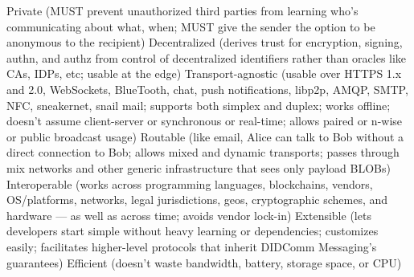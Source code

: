 Private (MUST prevent unauthorized third parties from learning who’s communicating about what, when; MUST give the sender the option to be anonymous to the recipient)
Decentralized (derives trust for encryption, signing, authn, and authz from control of decentralized identifiers rather than oracles like CAs, IDPs, etc; usable at the edge)
Transport-agnostic (usable over HTTPS 1.x and 2.0, WebSockets, BlueTooth, chat, push notifications, libp2p, AMQP, SMTP, NFC, sneakernet, snail mail; supports both simplex and duplex; works offline; doesn’t assume client-server or synchronous or real-time; allows paired or n-wise or public broadcast usage)
Routable (like email, Alice can talk to Bob without a direct connection to Bob; allows mixed and dynamic transports; passes through mix networks and other generic infrastructure that sees only payload BLOBs)
Interoperable (works across programming languages, blockchains, vendors, OS/platforms, networks, legal jurisdictions, geos, cryptographic schemes, and hardware — as well as across time; avoids vendor lock-in)
Extensible (lets developers start simple without heavy learning or dependencies; customizes easily; facilitates higher-level protocols that inherit DIDComm Messaging’s guarantees)
Efficient (doesn’t waste bandwidth, battery, storage space, or CPU)


